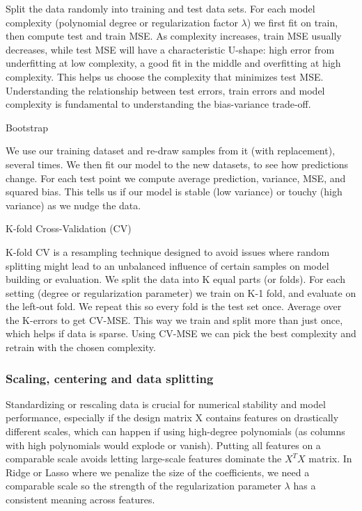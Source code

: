 \documentclass[amssymb,twocolumn,aps]{revtex4-2}
\begin{document}
Split the data randomly into training and test data sets. For each model complexity (polynomial degree or regularization factor $\lambda$) we first fit on train, then compute test and train MSE. As complexity increases, train MSE usually decreases, while test MSE will have a characteristic U-shape: high error from underfitting at low complexity, a good fit in the middle and overfitting at high complexity. This helps us choose the complexity that minimizes test MSE. Understanding the relationship between test errors, train errors and model complexity is fundamental to understanding the bias-variance trade-off. 

{Bootstrap}

We use our training dataset and re-draw samples from it (with replacement), several times. We then fit our model to the new datasets, to see how predictions change. For each test point we compute average prediction, variance, MSE, and squared bias. This tells us if our model is stable (low variance) or touchy (high variance) as we nudge the data. 

{K-fold Cross-Validation (CV)}

K-fold CV is a resampling technique designed to avoid issues where random splitting might lead to an unbalanced influence of certain samples on model building or evaluation. We split the data into K equal parts (or folds). For each setting (degree or regularization parameter) we train on K-1 fold, and evaluate on the left-out fold. We repeat this so every fold is the test set once. Average over the K-errors to get CV-MSE. This way we train and split more than just once, which helps if data is sparse. Using CV-MSE we can pick the best complexity and retrain with the chosen complexity.  

\subsubsection{Scaling, centering and data splitting}

Standardizing or rescaling data is crucial for numerical stability and model performance, especially if the design matrix X contains features on drastically different scales, which can happen if using high-degree polynomials (as columns with high polynomials would explode or vanish). Putting all features on a comparable scale avoids letting large-scale features dominate the $X^TX$ matrix. In Ridge or Lasso where we penalize the size of the coefficients, we need a comparable scale so the strength of the regularization parameter $\lambda$ has a consistent meaning across features. \\
\end{document}
